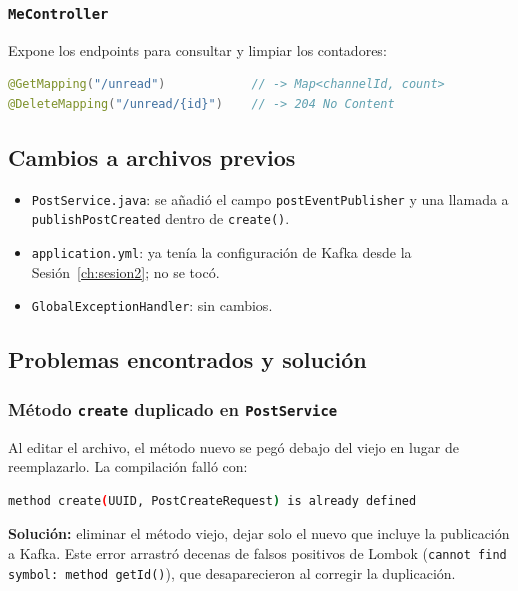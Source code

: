 \subsubsection{\texttt{MeController}}

Expone los endpoints para consultar y limpiar los contadores:

\begin{lstlisting}[language=java]
@GetMapping("/unread")            // -> Map<channelId, count>
@DeleteMapping("/unread/{id}")    // -> 204 No Content
\end{lstlisting}

\subsection{Cambios a archivos previos}

\begin{itemize}[leftmargin=*]
  \item \texttt{PostService.java}: se añadió el campo \texttt{postEventPublisher} y una llamada a \texttt{publishPostCreated} dentro de \texttt{create()}.
  \item \texttt{application.yml}: ya tenía la configuración de Kafka desde la Sesión~\ref{ch:sesion2}; no se tocó.
  \item \texttt{GlobalExceptionHandler}: sin cambios.
\end{itemize}

\subsection{Problemas encontrados y solución}

\subsubsection{Método \texttt{create} duplicado en \texttt{PostService}}

Al editar el archivo, el método nuevo se pegó debajo del viejo en lugar de reemplazarlo. La compilación falló con:

\begin{lstlisting}[language=bash]
method create(UUID, PostCreateRequest) is already defined
\end{lstlisting}

\textbf{Solución:} eliminar el método viejo, dejar solo el nuevo que incluye la publicación a Kafka. Este error arrastró decenas de falsos positivos de Lombok (\texttt{cannot find symbol: method getId()}), que desaparecieron al corregir la duplicación.

